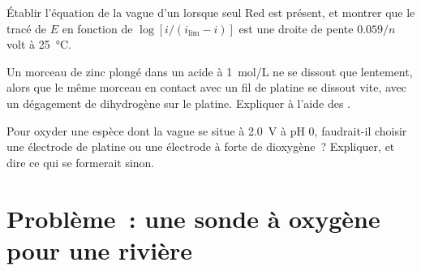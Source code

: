 \begin{exercise}[$\star\star\star$]\label{exo:b2:current-potential-curves:10}
Établir l'équation de la vague d'un  lorsque seul Red est présent, et
montrer que le tracé de $E$ en fonction de $\log[i/(i_{\lim} - i)]$ est une droite de
pente $0.059/n$ volt à \qty{25}{\degreeCelsius}.
\end{exercise}

\begin{exercise}[$\star\star\star$]\label{exo:b2:current-potential-curves:11}
Un morceau de zinc plongé dans un acide à \qty{1}{mol/L} ne se dissout que lentement, alors que
le même morceau en contact avec un fil de platine se dissout vite, avec un dégagement de dihydrogène
sur le platine. Expliquer à l'aide des .
\end{exercise}

\begin{exercise}[$\star\star\star$]\label{exo:b2:current-potential-curves:12}
Pour oxyder une espèce dont la vague se situe à \qty{2.0}{V} à pH 0, faudrait-il choisir une
électrode de platine ou une électrode à forte  de dioxygène~? Expliquer, et dire
ce qui se formerait sinon.
\end{exercise}

\section{Problème~: une sonde à oxygène pour une rivière}

